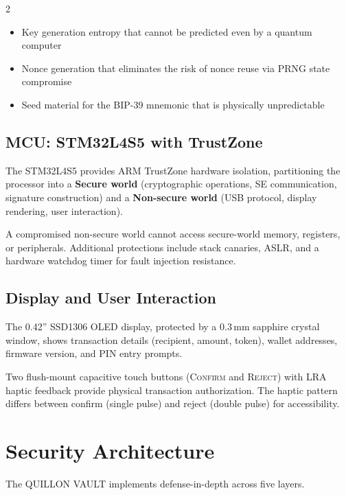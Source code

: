 \documentclass[11pt,a4paper]{article}
\begin{document}
\begin{multicols}{2}
\begin{itemize}[leftmargin=1.2em,itemsep=2pt]
  \item Key generation entropy that cannot be predicted even by a
    quantum computer
  \item Nonce generation that eliminates the risk of
    nonce reuse via PRNG state compromise
  \item Seed material for the BIP-39 mnemonic that is physically
    unpredictable
\end{itemize}

\subsection{MCU: STM32L4S5 with TrustZone}

The STM32L4S5 provides ARM TrustZone hardware isolation, partitioning
the processor into a \textbf{Secure world} (cryptographic operations,
SE communication, signature construction) and a \textbf{Non-secure world}
(USB protocol, display rendering, user interaction).

A compromised non-secure world cannot access secure-world memory,
registers, or peripherals. Additional protections include stack canaries,
ASLR, and a hardware watchdog timer for fault injection resistance.

\subsection{Display and User Interaction}

The 0.42'' SSD1306 OLED display, protected by a 0.3\,mm sapphire
crystal window, shows transaction details (recipient, amount, token),
wallet addresses, firmware version, and PIN entry prompts.

Two flush-mount capacitive touch buttons (\textsc{Confirm} and
\textsc{Reject}) with LRA haptic feedback provide physical transaction
authorization. The haptic pattern differs between confirm
(single pulse) and reject (double pulse) for accessibility.

\section{Security Architecture}

The QUILLON VAULT implements defense-in-depth across five layers.


\end{multicols}
\end{document}
